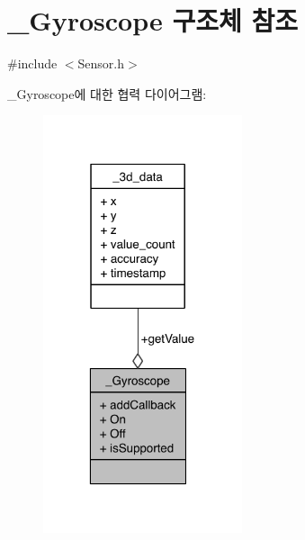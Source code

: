 \hypertarget{struct___gyroscope}{\section{\-\_\-\-Gyroscope 구조체 참조}
\label{struct___gyroscope}
}


{\ttfamily \#include $<$Sensor.\-h$>$}



\-\_\-\-Gyroscope에 대한 협력 다이어그램\-:
\nopagebreak
\begin{figure}[H]
\begin{center}
\leavevmode
\includegraphics[width=166pt]{da/db9/struct___gyroscope__coll__graph}
\end{center}
\end{figure}
